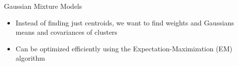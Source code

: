 \documentclass[compress,t]{beamer}
\begin{document}
\begin{frame}{Gaussian Mixture Models}
  \begin{itemize}
  \item Instead of finding just \alert{centroids}, we want to find
    \alert{weights} and Gaussians \alert{means} and
    \alert{covariances} of clusters
  \item Can be optimized efficiently using the
    \alert{Expectation-Maximization} (EM) algorithm
  \end{itemize}

  \begin{center}

\end{center}
\end{frame}
\end{document}
